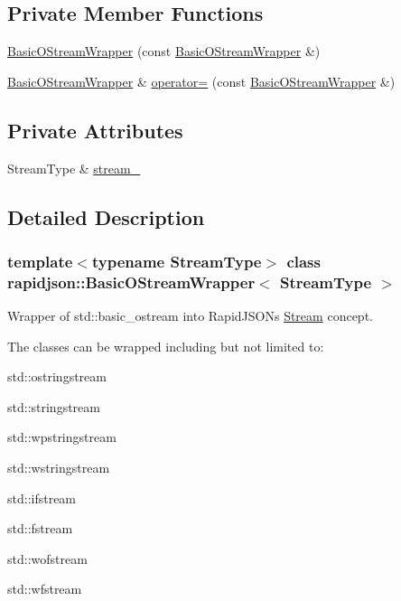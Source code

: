 \subsection*{Private Member Functions}
\begin{DoxyCompactItemize}
\item 
\mbox{\hyperlink{classrapidjson_1_1_basic_o_stream_wrapper_a9a5759c12a6496917b1776dade393730}{Basic\+O\+Stream\+Wrapper}} (const \mbox{\hyperlink{classrapidjson_1_1_basic_o_stream_wrapper}{Basic\+O\+Stream\+Wrapper}} \&)
\item 
\mbox{\hyperlink{classrapidjson_1_1_basic_o_stream_wrapper}{Basic\+O\+Stream\+Wrapper}} \& \mbox{\hyperlink{classrapidjson_1_1_basic_o_stream_wrapper_a7c64e252845130e2d77dc5f934c305a7}{operator=}} (const \mbox{\hyperlink{classrapidjson_1_1_basic_o_stream_wrapper}{Basic\+O\+Stream\+Wrapper}} \&)
\end{DoxyCompactItemize}
\subsection*{Private Attributes}
\begin{DoxyCompactItemize}
\item 
Stream\+Type \& \mbox{\hyperlink{classrapidjson_1_1_basic_o_stream_wrapper_a35af4b2c8ccfb61d87200d57e6f17076}{stream\+\_\+}}
\end{DoxyCompactItemize}


\subsection{Detailed Description}
\subsubsection*{template$<$typename Stream\+Type$>$\newline
class rapidjson\+::\+Basic\+O\+Stream\+Wrapper$<$ Stream\+Type $>$}

Wrapper of {\ttfamily std\+::basic\+\_\+ostream} into Rapid\+J\+S\+ON\textquotesingle{}s \mbox{\hyperlink{classrapidjson_1_1_stream}{Stream}} concept. 

The classes can be wrapped including but not limited to\+:


\begin{DoxyItemize}
\item {\ttfamily std\+::ostringstream} 
\item {\ttfamily std\+::stringstream} 
\item {\ttfamily std\+::wpstringstream} 
\item {\ttfamily std\+::wstringstream} 
\item {\ttfamily std\+::ifstream} 
\item {\ttfamily std\+::fstream} 
\item {\ttfamily std\+::wofstream} 
\item {\ttfamily std\+::wfstream} 
\end{DoxyItemize}


